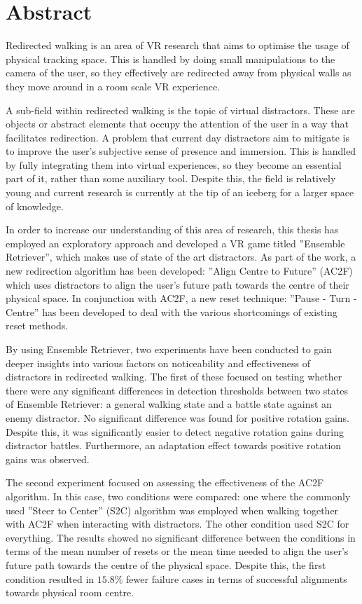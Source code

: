 \chapter*{Abstract}
Redirected walking is an area of VR research that aims to optimise the usage of physical tracking space. This is handled by doing small manipulations to the camera of the user, so they effectively are redirected away from physical walls as they move around in a room scale VR experience.

A sub-field within redirected walking is the topic of virtual distractors. These are objects or abstract elements that occupy the attention of the user in a way that facilitates redirection. A problem that current day distractors aim to mitigate is to improve the user's subjective sense of presence and immersion. This is handled by fully integrating them into virtual experiences, so they become an essential part of it, rather than some auxiliary tool. Despite this, the field is relatively young and current research is currently at the tip of an iceberg for a larger space of knowledge. 

In order to increase our understanding of this area of research, this thesis has employed an exploratory approach and developed a VR game titled ''Ensemble Retriever'', which makes use of state of the art distractors. As part of the work, a new redirection algorithm has been developed: ''Align Centre to Future'' (AC2F) which uses distractors to align the user's future path towards the centre of their physical space. In conjunction with AC2F, a new reset technique: ''Pause - Turn - Centre'' has been developed to deal with the various shortcomings of existing reset methods. 

By using Ensemble Retriever, two experiments have been conducted to gain deeper insights into various factors on noticeability and effectiveness of distractors in redirected walking. The first of these focused on testing whether there were any significant differences in detection thresholds between two states of Ensemble Retriever: a general walking state and a battle state against an enemy distractor. No significant difference was found for positive rotation gains. Despite this, it was significantly easier to detect negative rotation gains during distractor battles. Furthermore, an adaptation effect towards positive rotation gains was observed. 

The second experiment focused on assessing the effectiveness of the AC2F algorithm. In this case, two conditions were compared: one where the commonly used ''Steer to Center'' (S2C) algorithm was employed when walking together with AC2F when interacting with distractors. The other condition used S2C for everything. The results showed no significant difference between the conditions in terms of the mean number of resets or the mean time needed to align the user's future path towards the centre of the physical space. Despite this, the first condition resulted in $15.8\%$ fewer failure cases in terms of successful alignments towards physical room centre. 

